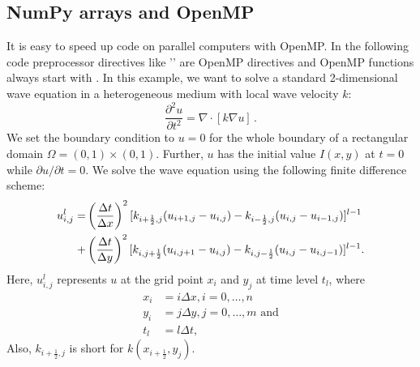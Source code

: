 \subsection{NumPy arrays and OpenMP}

It is easy to speed up code on parallel computers with OpenMP. In the
following code preprocessor directives like '' are OpenMP directives and OpenMP functions always start
with .  In this example, we want to solve a standard
2-dimensional wave equation in a heterogeneous medium with local wave
velocity $k$:
\begin{equation}
\frac{\partial^2u}{\partial t^2} = \nabla \cdot [k\nabla u]\, .
\end{equation}
We set the boundary condition to $u = 0$ for the whole boundary of a
rectangular domain $\Omega = (0,1) \times (0,1)$. Further, $u$ has the initial
value $I(x,y)$ at $t = 0$ while $\partial u/ \partial t = 0$.
We solve the wave equation using the following finite difference scheme:
\begin{align}
u_{i,j}^l =
&\left(\frac{\Delta t}{\Delta x}\right)^2
[k_{i+\frac{1}{2},j}(u_{i+1,j} - u_{i,j}) - k_{i-\frac{1}{2},j}(u_{i,j} - u_{i-1,j})]^{l-1}\notag\\
+&\left(\frac{\Delta t}{\Delta y}\right)^2
[k_{i,j+\frac{1}{2}}(u_{i,j+1} - u_{i,j}) - k_{i,j-\frac{1}{2}}(u_{i,j} - u_{i,j-1})]^{l-1}.
\end{align}\label{u}
Here, $u_{i,j}^l$ represents $u$ at the grid point $x_i$ and $y_j$ at
time level $t_l$, where
\begin{align}
x_i &= i\Delta x, i = 0, \ldots, n\\
y_i &= j\Delta y, j = 0, \ldots, m\textrm{ and}\\
t_l &= l\Delta t,
\end{align}
Also, $k_{i+\frac{1}{2},j}$ is short for $k(x_{i+\frac{1}{2}},y_j)$.

